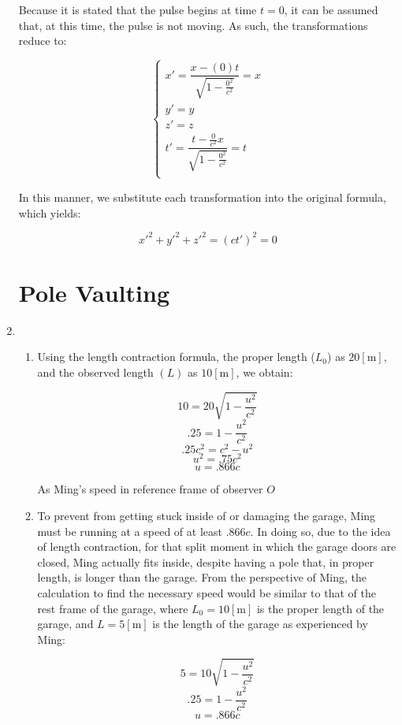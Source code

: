 \begin{enumerate}
        Because it is stated that the pulse begins at time $t=0$, it can be assumed that, at this time, the pulse is not moving. As such, the transformations reduce to:

        $$\left\{\begin{array}{l}x'=\dfrac{x-(0)t}{\sqrt{1-\frac{0^2}{c^2}}}=x\\y'=y\\z'=z\\t'=\dfrac{t-\frac{0}{c^2}x}{\sqrt{1-\frac{0^2}{c^2}}}=t\\ \end{array}$$

          In this manner, we substitute each transformation into the original formula, which yields:

          $$\boxed{x'^2+y'^2+z'^2=(ct')^2=0}$$

    \section{Pole Vaulting}

  \item

    \begin{enumerate}

      \item Using the length contraction formula, the proper length ($L_0$) as $20[\si{\meter}]$, and the observed length $(L)$ as $10[\si{\meter}]$, we obtain:

        $$10 = 20\sqrt{1-\dfrac{u^2}{c^2}}$$
        $$.25=1-\dfrac{u^2}{c^2}$$
        $$.25c^2=c^2-u^2$$
        $$u^2=.75c^2$$
        $$\boxed{u=.866c}$$

        As Ming's speed in reference frame of observer $O$

      \item To prevent from getting stuck inside of or damaging the garage, Ming must be running at a speed of at least $.866c$. In doing so, due to the idea of length contraction, for that split moment in which the garage doors are closed, Ming actually fits inside, despite having a pole that, in proper length, is longer than the garage. From the perspective of Ming, the calculation to find the necessary speed would be similar to that of the rest frame of the garage, where $L_0=10[\si{\meter}]$ is the proper length of the garage, and $L=5[\si{\meter}]$ is the length of the garage as experienced by Ming:

        $$5=10\sqrt{1-\dfrac{u^2}{c^2}}$$
        $$.25=1-\dfrac{u^2}{c^2}$$
        $$u=.866c$$


\end{enumerate}
\end{enumerate}

